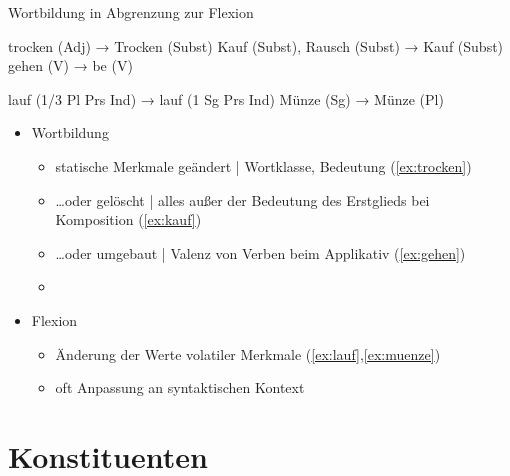 \begin{frame}
  {Wortbildung in Abgrenzung zur Flexion}
  \pause
  \begin{exe}
    \ex
    \begin{xlist}
      \ex trocken (Adj) → \alert{Trocken} (Subst)\label{ex:trocken}
      \ex Kauf (Subst), Rausch (Subst) → \alert{Kauf} (Subst)\label{ex:kauf}
      \ex gehen (V) → \alert{be} (V)\label{ex:gehen}
    \end{xlist}
    \pause
    \ex
    \begin{xlist}
      \ex \alert{lauf} (1\slash 3 Pl Prs Ind) → \alert{lauf} (1 Sg Prs Ind)\label{ex:lauf}
      \ex \alert{Münze} (Sg) → \alert{Münze} (Pl)\label{ex:muenze}
    \end{xlist}
  \end{exe}
  \pause
  \Halbzeile
  \begin{itemize}[<+->]
    \item Wortbildung
      \begin{itemize}[<+->]
        \item statische Merkmale geändert | Wortklasse, Bedeutung \alert{(\ref{ex:trocken})}
        \item \ldots oder gelöscht | alles außer der Bedeutung des Erstglieds bei Komposition \alert{(\ref{ex:kauf})}
        \item \ldots oder umgebaut | Valenz von Verben beim Applikativ \alert{(\ref{ex:gehen})}
        \item {}
      \end{itemize}
  \Halbzeile
    \item Flexion
      \begin{itemize}
        \item Änderung der Werte volatiler Merkmale \alert{(\ref{ex:lauf},\ref{ex:muenze})}
        \item \alert{oft Anpassung an syntaktischen Kontext}
      \end{itemize}
  \end{itemize}
\end{frame}


\section{Konstituenten}


